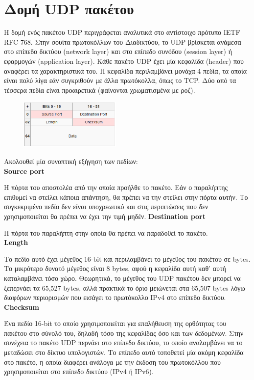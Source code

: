 \documentclass{article}
\begin{document}
\section*{Δομή UDP πακέτου}
Η δομή ενός πακέτου UDP περιγράφεται αναλυτικά στο αντίστοιχο πρότυπο IETF RFC 768. Στην σουίτα πρωτοκόλλων του Διαδικτύου, το UDP βρίσκεται ανάμεσα στο επίπεδο δικτύου (network layer) και στο επίπεδο συνόδου (session layer) ή εφαρμογών (application layer).
Κάθε πακέτο UDP έχει μία κεφαλίδα (header) που αναφέρει τα χαρακτηριστικά του. Η κεφαλίδα περιλαμβάνει μονάχα 4 πεδία, τα οποία είναι πολύ λίγα εάν συγκριθούν με άλλα πρωτόκολλα, όπως το TCP. Δύο από τα τέσσερα πεδία είναι προαιρετικά (φαίνονται χρωματισμένα με ροζ). \clearpage
\begin{figure}[h!]
 \begin{center}
  \includegraphics[width=50mm,scale=0.7]{pic1.png}
\end{center}
\end{figure}
Ακολουθεί μία συνοπτική εξήγηση των πεδίων: \\
\textbf{Source port}
\par{Η πόρτα του αποστολέα από την οποία προήλθε το πακέτο. Εάν ο παραλήπτης επιθυμεί να στείλει κάποια απάντηση, θα πρέπει να την στείλει στην πόρτα αυτήν. Το συγκεκριμένο πεδίο δεν είναι υποχρεωτικό και στις περιπτώσεις που δεν χρησιμοποιείται θα πρέπει να έχει την τιμή μηδέν.}
\textbf{Destination port}
\par{Η πόρτα του παραλήπτη στην οποία θα πρέπει να παραδοθεί το πακέτο.} \\
\textbf{Length}
\par{Το πεδίο αυτό έχει μέγεθος 16-bit και περιλαμβάνει το μέγεθος του πακέτου σε bytes. Το μικρότερο δυνατό μέγεθος είναι 8 bytes, αφού η κεφαλίδα αυτή καθ' αυτή καταλαμβάνει τόσο χώρο. Θεωρητικά, το μέγεθος του UDP πακέτου δεν μπορεί να ξεπερνάει τα 65,527 bytes, αλλά πρακτικά το όριο μειώνεται στα 65,507 bytes λόγω διαφόρων περιορισμών που εισάγει το πρωτόκολλο IPv4 στο επίπεδο δικτύου.} \\
\textbf{Checksum} 
\par{    Ένα πεδίο 16-bit το οποίο χρησιμοποιείται για επαλήθευση της ορθότητας του πακέτου στο σύνολό του, δηλαδή τόσο της κεφαλίδας όσο και των δεδομένων. Στην συνέχεια το πακέτο UDP περνάει στο επίπεδο δικτύου, το οποίο αναλαμβάνει να το μεταδώσει στο δίκτυο υπολογιστών. Το επίπεδο αυτό τοποθετεί μία ακόμη κεφαλίδα στο πακέτο, η οποία διαφέρει ανάλογα με την έκδοση του πρωτοκόλλου που χρησιμοποιείται στο επίπεδο δικτύου (IPv4 ή IPv6). } \\
\end{document}
